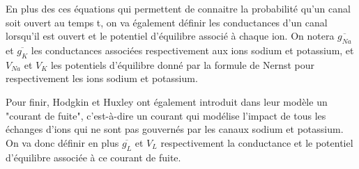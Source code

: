 \documentclass[12pt]{scrartcl}
\begin{document}
En plus des ces équations qui permettent de connaitre la probabilité qu'un canal soit ouvert au temps t, on va également définir les conductances d'un canal lorsqu'il est ouvert et le potentiel d'équilibre associé à chaque ion. On notera $\overline{g_{Na}}$ et $\overline{g_K}$ les conductances associées respectivement aux ions sodium et potassium, et $V_{Na}$ et $V_K$ les potentiels d'équilibre donné par la formule de Nernst pour respectivement les ions sodium et potassium.

Pour finir, Hodgkin et Huxley ont également introduit dans leur modèle un "courant de fuite", c'est-à-dire un courant qui modélise l'impact de tous les échanges d'ions qui ne sont pas gouvernés par les canaux sodium et potassium. On va donc définir en plus $\overline{g_L}$ et $V_L$ respectivement la conductance et le potentiel d'équilibre associée à ce courant de fuite.

\pagebreak
\end{document}
